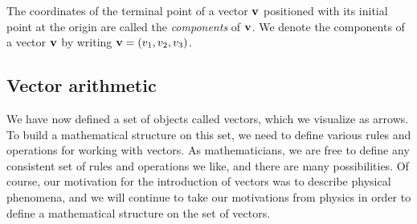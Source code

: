 \documentclass[12pt,letterpaper,reqno]{article}
\numberwithin{equation}{section}
\newcommand{\ti}[1]{\textit{#1}}
\begin{document}
\begin{defn}
	The coordinates of the terminal point of a vector ${\bf v}$ positioned with its initial point at the origin are called the \ti{components} of ${\bf v}$. We denote the components of a vector ${\bf v}$ by writing ${\bf v}=(v_1,v_2,v_3)$.
\end{defn}

\subsection{Vector arithmetic}
We have now defined a set of objects called vectors, which we visualize as arrows. To build a mathematical structure on this set, we need to define various rules and operations for working with vectors. As mathematicians, we are free to define any consistent set of rules and operations we like, and there are many possibilities.  Of course, our motivation for the introduction of vectors was to describe physical phenomena, and we will continue to take our motivations from physics in order to define a mathematical structure on the set of vectors.
\end{document}
